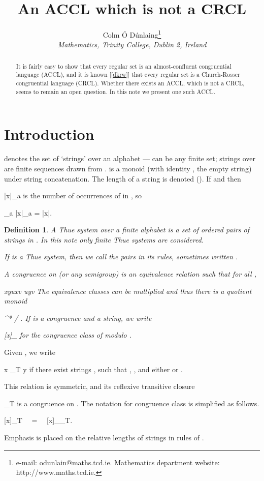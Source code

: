 \documentclass[12pt,a4paper]{article}
\title{An ACCL which is not a CRCL}
\author{Colm \'O D\'unlaing\thanks{e-mail: odunlain@maths.tcd.ie.
Mathematics department website: http://www.maths.tcd.ie.}\\
{\em Mathematics, Trinity College, Dublin 2, Ireland}}
\newtheorem{definition}[theorem]{Definition}
\newcommand{\thuecong}{{\overset{*}{\leftrightarrow}}}
\numberwithin{equation}{section}
\newcommand{\be}{}
\begin{document}
\maketitle
\begin{abstract}
It is fairly easy to show that every regular set is
an almost-confluent congruential language (ACCL), and it
is known [\ref{dkrw}] that every regular set
is a Church-Rosser congruential language (CRCL).
Whether there exists an ACCL, which is not a CRCL, seems to remain
an open question.  In this note we present one such ACCL.
\end{abstract}

\section{Introduction}

 denotes the set of `strings' over an alphabet
 ---  can be any finite set;
strings over  are finite sequences drawn from .
 is a  monoid (with identity , the empty string)
under string concatenation.
The length of a string  is denoted  ().
If  and  then

\be
|x|_a
\ee
is the number of occurrences of  in , so
\be
\sum_{a \in \Sigma} |x|_a = |x|.
\ee


\begin{definition}
\label{def: thue congruence}
A {\em Thue system} over a finite alphabet 
is a set of ordered pairs  of strings
in .
In this note only finite Thue systems are considered.


If  is a Thue system, then we call the pairs
 in  its {\em rules}, sometimes written
.

A {\em congruence} on  (or any semigroup) is
an equivalence relation  such that
for all ,
\be
x\equiv y\implies uxv \equiv uyv
\ee
The equivalence classes can be multiplied and
thus there is a quotient monoid
\be
\Sigma^* / \equiv .
\ee
If  is a congruence and  a string, we write
\be
[x]_\equiv
\ee
for the congruence class of  modulo .
\end{definition}

\noindent
Given , we write
\be
x \leftrightarrow_T y
\ee
if there exist strings , such
that , , and
either  or .


This relation is symmetric, and its
reflexive transitive closure
\be
{\thuecong}_T
\ee
is a congruence on .
The notation for  congruence class is simplified as follows.
\be
[x]_T ~~=~~ [x]_{{\thuecong}_T}.
\ee

Emphasis is placed on the relative lengths of strings
in rules of .
\end{document}
